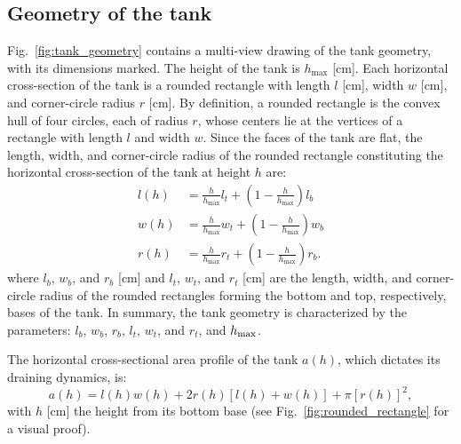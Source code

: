 \documentclass[a4paper,fleqn]{cas-dc}
\begin{document}
\subsection{Geometry of the tank}
Fig.~\ref{fig:tank_geometry} contains a multi-view drawing of the tank geometry, with its dimensions marked.
The height of the tank is $h_{\text{max}}$ [cm].
Each horizontal cross-section of the tank is a rounded rectangle with length $l$ [cm], width $w$ [cm], and corner-circle radius $r$ [cm].
By definition, a rounded rectangle is the convex hull of four circles, each of radius $r$, whose centers lie at the vertices of a rectangle with length $l$ and width $w$. \cite{rounded_rect}
Since the faces of the tank are flat, the length, width, and corner-circle radius of the rounded rectangle constituting the horizontal cross-section of the tank at height $h$ are:
\begin{align}
	l(h) &= \frac{h}{h_{\text{max}}}l_t + \left(1-\frac{h}{h_{\text{max}}}\right) l_b \\
	w(h) &= \frac{h}{h_{\text{max}}}w_t + \left(1-\frac{h}{h_{\text{max}}}\right) w_b \\
	r(h) &= \frac{h}{h_{\text{max}}}r_t + \left(1-\frac{h}{h_{\text{max}}}\right) r_b.
\end{align}
where $l_b$, $w_b$, and $r_b$ [cm] and $l_t$, $w_t$, and $r_t$ [cm] are the length, width, and corner-circle radius of the rounded rectangles forming the bottom and top, respectively, bases of the tank.
In summary, the tank geometry is characterized by the parameters: $l_b$, $w_b$, $r_b$, $l_t$, $w_t$, and $r_t$, and $h_{\rm max}$.

The horizontal cross-sectional area profile of the tank $a(h)$, which dictates its draining dynamics, is:
\begin{equation}
	a(h) = l(h) w(h) + 2 r(h) [l(h) + w(h)] + \pi [r(h)]^2, \label{eq:a_of_h}
\end{equation}
with $h$ [cm] the height from its bottom base (see Fig.~\ref{fig:rounded_rectangle} for a visual proof).
%
\end{document}
